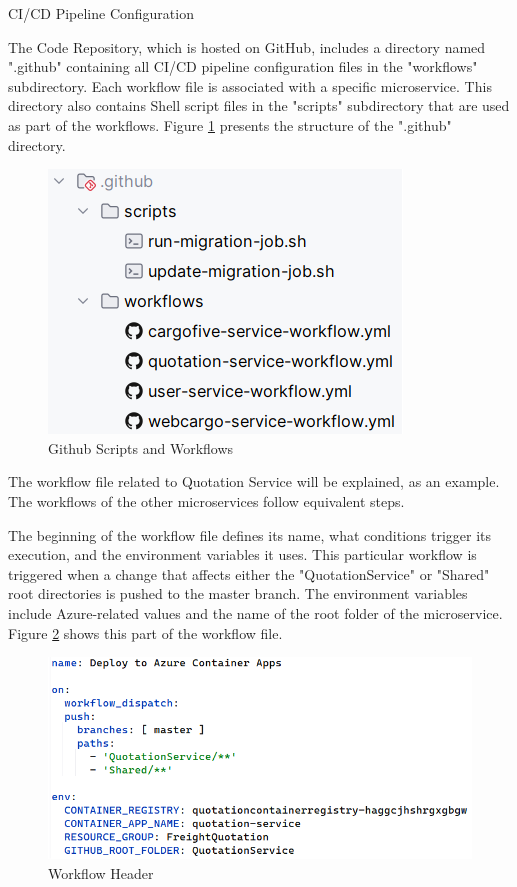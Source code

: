 \documentclass[12pt, reqno, oneside]{amsbook}
\makeatletter
\def\section{\@startsection{section}{1}%
      \z@{.5\linespacing\@plus.7\linespacing}{.25\linespacing}%
      {\normalfont\bfseries\flushleft}}
\theoremstyle{definition}
\theoremstyle{definition}
\numberwithin{section}{chapter}
\numberwithin{table}{chapter}
\numberwithin{figure}{chapter}
\makeatother
\begin{document}
\section{\texorpdfstring{\ac{CI/CD}}{CI/CD} Pipeline Configuration}

The Code Repository, which is hosted on GitHub, includes a directory named ".github" containing all \ac{CI/CD} pipeline configuration files in the "workflows" subdirectory. Each workflow file is associated with a specific microservice. This directory also contains Shell script files in the "scripts" subdirectory that are used as part of the workflows. Figure \ref{Figure:GithubScriptsAndWorkflows} presents the structure of the ".github" directory.

\begin{figure}[H]
  \centering
  \includegraphics[width=0.6\linewidth]{images/GithubScriptsAndWorkflows.png}
  \caption{\label{Figure:GithubScriptsAndWorkflows}Github Scripts and Workflows}
\end{figure}

The workflow file related to Quotation Service will be explained, as an example. The workflows of the other microservices follow equivalent steps.

The beginning of the workflow file defines its name, what conditions trigger its execution, and the environment variables it uses. This particular workflow is triggered when a change that affects either the "QuotationService" or "Shared" root directories is pushed to the master branch. The environment variables include Azure-related values and the name of the root folder of the microservice. Figure \ref{Figure:GithubWorkflowHeader} shows this part of the workflow file.

\begin{figure}[H]
  \centering
  \includegraphics[width=0.9\linewidth]{images/GithubWorkflowHeader.png}
  \caption{\label{Figure:GithubWorkflowHeader}Workflow Header}
\end{figure}
\end{document}
